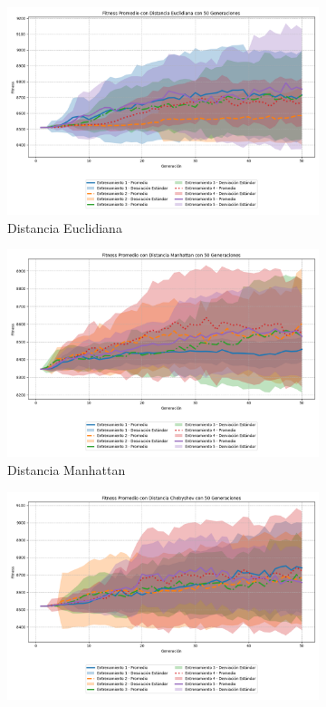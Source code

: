 \documentclass[conference]{IEEEtran}
\begin{document}
\begin{figure}[ht]
    \centering
    \begin{subfigure}{0.3\textwidth}
        \centering
        \includegraphics[width=0.9\linewidth]{Euclidiana/Mapa2/Fitness_Prrm_Map2_Eucli_50Gen.png}
        \caption{Distancia Euclidiana}
        \label{fig:ecuclidiana_mapa2}
    \end{subfigure}
    \hfill
    \begin{subfigure}{0.3\textwidth}
        \centering
        \includegraphics[width=0.9\linewidth]{Manhattan/Mapa2/Fitness_Prom_Map2_Manh_50Gen.png}
        \caption{Distancia Manhattan}
        \label{fig:manhattan_mapa2}
    \end{subfigure}
    \hfill
    \begin{subfigure}{0.3\textwidth}
        \centering
        \includegraphics[width=0.9\linewidth]{Chebyshev/Mapa2/Fitness_Prom_Map2_Cheby_50Gen.png}

\end{subfigure}
\end{figure}
\end{document}
